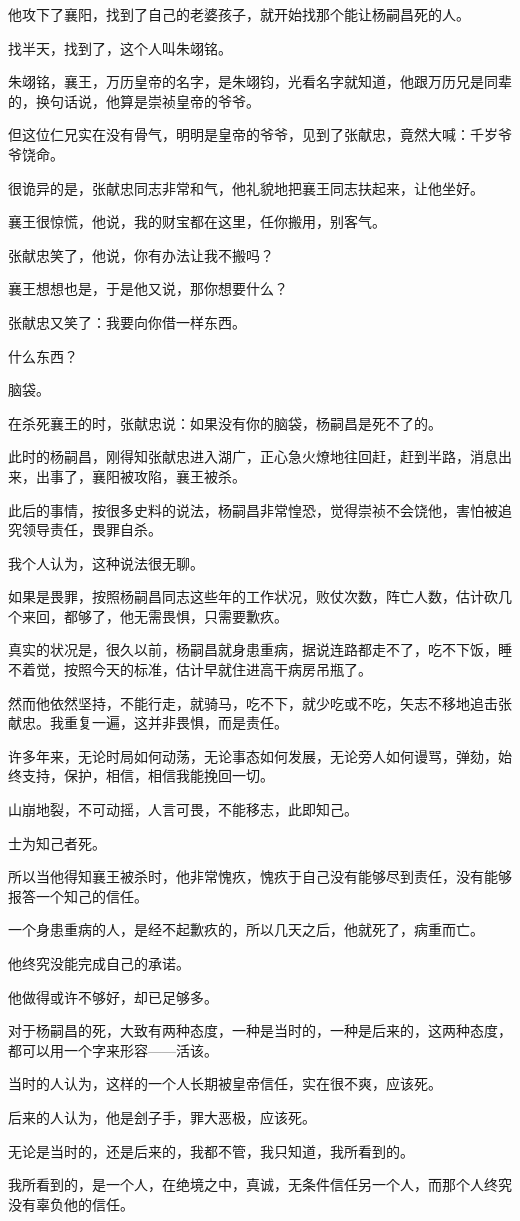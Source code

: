 \begin{multicols}{\theparacolNo}
他攻下了襄阳，找到了自己的老婆孩子，就开始找那个能让杨嗣昌死的人。

找半天，找到了，这个人叫朱翊铭。

朱翊铭，襄王，万历皇帝的名字，是朱翊钧，光看名字就知道，他跟万历兄是同辈的，换句话说，他算是崇祯皇帝的爷爷。

但这位仁兄实在没有骨气，明明是皇帝的爷爷，见到了张献忠，竟然大喊：千岁爷爷饶命。

很诡异的是，张献忠同志非常和气，他礼貌地把襄王同志扶起来，让他坐好。

襄王很惊慌，他说，我的财宝都在这里，任你搬用，别客气。

张献忠笑了，他说，你有办法让我不搬吗？

襄王想想也是，于是他又说，那你想要什么？

张献忠又笑了：我要向你借一样东西。

什么东西？

脑袋。

在杀死襄王的时，张献忠说：如果没有你的脑袋，杨嗣昌是死不了的。

此时的杨嗣昌，刚得知张献忠进入湖广，正心急火燎地往回赶，赶到半路，消息出来，出事了，襄阳被攻陷，襄王被杀。

此后的事情，按很多史料的说法，杨嗣昌非常惶恐，觉得崇祯不会饶他，害怕被追究领导责任，畏罪自杀。

我个人认为，这种说法很无聊。

如果是畏罪，按照杨嗣昌同志这些年的工作状况，败仗次数，阵亡人数，估计砍几个来回，都够了，他无需畏惧，只需要歉疚。

真实的状况是，很久以前，杨嗣昌就身患重病，据说连路都走不了，吃不下饭，睡不着觉，按照今天的标准，估计早就住进高干病房吊瓶了。

然而他依然坚持，不能行走，就骑马，吃不下，就少吃或不吃，矢志不移地追击张献忠。我重复一遍，这并非畏惧，而是责任。

许多年来，无论时局如何动荡，无论事态如何发展，无论旁人如何谩骂，弹劾，始终支持，保护，相信，相信我能挽回一切。

山崩地裂，不可动摇，人言可畏，不能移志，此即知己。

士为知己者死。

所以当他得知襄王被杀时，他非常愧疚，愧疚于自己没有能够尽到责任，没有能够报答一个知己的信任。

一个身患重病的人，是经不起歉疚的，所以几天之后，他就死了，病重而亡。

他终究没能完成自己的承诺。

他做得或许不够好，却已足够多。

对于杨嗣昌的死，大致有两种态度，一种是当时的，一种是后来的，这两种态度，都可以用一个字来形容——活该。

当时的人认为，这样的一个人长期被皇帝信任，实在很不爽，应该死。

后来的人认为，他是刽子手，罪大恶极，应该死。

无论是当时的，还是后来的，我都不管，我只知道，我所看到的。

我所看到的，是一个人，在绝境之中，真诚，无条件信任另一个人，而那个人终究没有辜负他的信任。
\ifnum{}
	\end{multicols}
\fi
\newpage
